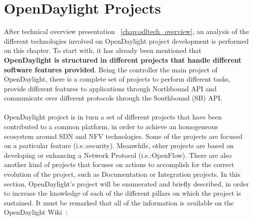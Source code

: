 \documentclass[a4paper, 12pt]{book}
\begin{document}
\section{OpenDaylight Projects}
\label{chap:odltech_projects}
After technical overview presentation ~\ref{chap:odltech_overview}, an analysis of the different technologies involved on OpenDaylight project development is performed on this chapter. To start with, it has already been mentioned that \textbf{OpenDaylight is structured in different projects that handle different software features provided}. Being the controller the main project of OpenDaylight, there is a complete set of projects to perform different tasks, provide different features to applications through Northbound API and communicate over different protocols through the Southbound (SB) API.\\
\\
OpenDaylight project is in turn a set of different projects that have been contributed to a common platform, in order to achieve an homogeneous ecosystem around SDN and NFV technologies. Some of the projects are focused on a particular feature (i.e.:security). Meanwhile, other projects are based on developing or enhancing a Network Protocol (i.e.:OpenFlow). There are also another kind of projects that focuses on actions to accomplish for the correct evolution of the project, such as Documentation or Integration projects. In this section, OpenDaylight's project will be enumerated and briefly described, in order to increase the knowledge of each of the different pillars on which the project is sustained. It must be remarked that all of the information is available on the OpenDaylight Wiki~\cite{OpenDaylightWiki}:
\end{document}
